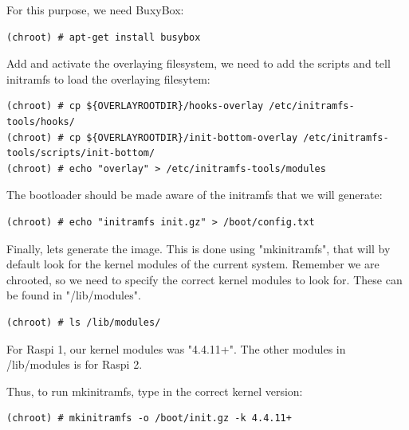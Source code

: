 For this purpose, we need BuxyBox:

\begin{lstlisting}[]
(chroot) # apt-get install busybox
\end{lstlisting}
\FloatBarrier
\vspace{-5mm}

Add and activate the overlaying filesystem, we need to add the scripts and tell initramfs
to load the overlaying filesytem:

\begin{lstlisting}[]
(chroot) # cp ${OVERLAYROOTDIR}/hooks-overlay /etc/initramfs-tools/hooks/
(chroot) # cp ${OVERLAYROOTDIR}/init-bottom-overlay /etc/initramfs-tools/scripts/init-bottom/
(chroot) # echo "overlay" > /etc/initramfs-tools/modules
\end{lstlisting}
\FloatBarrier
\vspace{-5mm}

The bootloader should be made aware of the initramfs that we will generate:

\begin{lstlisting}[]
(chroot) # echo "initramfs init.gz" > /boot/config.txt
\end{lstlisting}
\FloatBarrier
\vspace{-5mm}

Finally, lets generate the image. This is done using "mkinitramfs", that will
by default look for the kernel modules of the current system. Remember we are
chrooted, so we need to specify the correct kernel modules to look for. These
can be found in "/lib/modules".

\begin{lstlisting}[]
(chroot) # ls /lib/modules/
\end{lstlisting}
\FloatBarrier
\vspace{-5mm}

For \ac{Raspi} 1, our kernel modules was "4.4.11+". The other modules in /lib/modules
is for \ac{Raspi} 2.

Thus, to run mkinitramfs, type in the correct kernel version:

\begin{lstlisting}[]
(chroot) # mkinitramfs -o /boot/init.gz -k 4.4.11+
\end{lstlisting}
\FloatBarrier
\vspace{-5mm}

